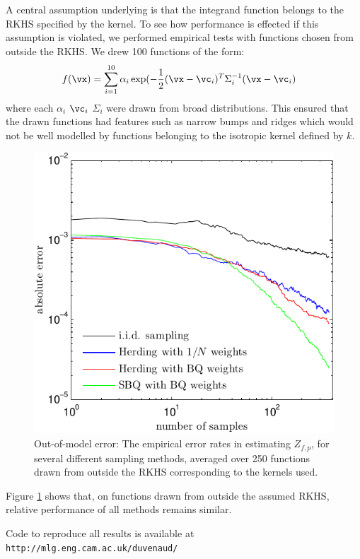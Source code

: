 A central assumption underlying \sbq{} is that the integrand function belongs to the RKHS specified by the kernel.  To see how performance is effected if this assumption is violated, we performed empirical tests with functions chosen from outside the RKHS.  We drew 100 functions of the form:
%
\begin{align}
f(\vx) & = \sum_{i=1}^{10} \alpha_i \exp(-\frac{1}{2} (\vx -\vc_i)^T \Sigma_i^{-1} (\vx -\vc_i)
\end{align}
%
where each $\alpha_i$ $\vc_i$ $\Sigma_i$ were drawn from broad distributions.  This ensured that the drawn functions had features such as narrow bumps and ridges which would not be well modelled by functions belonging to the isotropic kernel defined by $k$.
%
\begin{figure}
\includegraphics[width=\columnwidth]{figs/herding/error_curve_outmodel_400_v3}
\caption{Out-of-model error: The empirical error rates in estimating $Z_{f,p}$, for several different sampling methods, averaged over 250 functions drawn from outside the RKHS corresponding to the kernels used.}
\label{fig:error_curve_outmodel}
\end{figure}
%
Figure \ref{fig:error_curve_outmodel} shows that, on functions drawn from outside the assumed RKHS, relative performance of all methods remains similar.

Code to reproduce all results is available at \texttt{http://mlg.eng.cam.ac.uk/duvenaud/}


